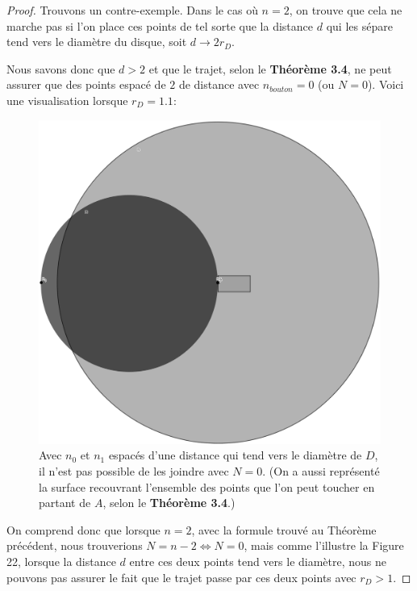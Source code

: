 \documentclass[a4paper]{amsart}
\theoremstyle{definition}
\theoremstyle{remark}
\numberwithin{equation}{section}
\begin{document}
\begin{proof}
  Trouvons un contre-exemple. Dans le cas où $n=2$, on trouve que cela ne marche pas si l'on place ces points de tel sorte que la distance $d$ qui les sépare tend vers le diamètre du disque, soit $d\to2r_D$.

  Nous savons donc que $d>2$ et que le trajet, selon le \textbf{Théorème 3.4}, ne peut assurer que des points espacé de $2$ de distance avec $n_{bouton}=0$ (ou $N=0$). Voici une visualisation lorsque $r_D=1.1$:

  \begin{figure}[H]
    \centering
    \includegraphics[scale=0.2]{images/q3_not_possible.png}
    \caption{Avec $n_0$ et $n_1$ espacés d'une distance qui tend vers le diamètre de $D$, il n'est pas possible de les joindre avec $N=0$. (On a aussi représenté la surface recouvrant l'ensemble des points que l'on peut toucher en partant de $A$, selon 
    le \textbf{Théorème 3.4}.)}
  \end{figure}

  On comprend donc que lorsque $n=2$, avec la formule trouvé au Théorème précédent, nous trouverions $N=n-2\Leftrightarrow N=0$, mais comme l'illustre la Figure 22, lorsque la distance $d$ entre ces deux points tend vers le diamètre, nous ne pouvons pas assurer
  le fait que le trajet passe par ces deux points avec $r_D>1$.
\end{proof}
\end{document}
